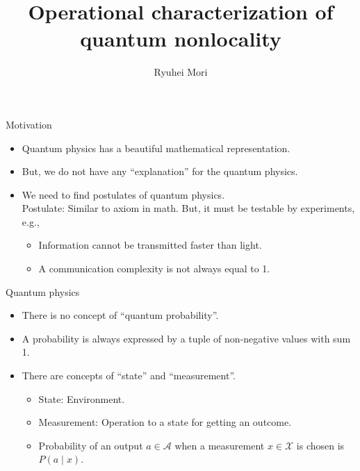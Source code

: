 \documentclass{beamer}
\title{Operational characterization of quantum nonlocality}
\author{Ryuhei Mori}
\institute{Tokyo Institute of Technology}
\date{}
\newcommand\emm[1]{\textcolor{redorange}{{#1}}}
\begin{document}
\begin{frame}[plain]
\maketitle
\end{frame}

\begin{frame}{Motivation}
\begin{itemize}
\setlength{\itemsep}{3.0em}
\item Quantum physics has a beautiful mathematical representation.
\item But, we do not have any ``explanation'' for the quantum physics.
\item We need to find \emm{postulates} of quantum physics.\\
\vspace{1em}
Postulate: Similar to axiom in math. But, it must be testable by experiments, e.g.,
\begin{itemize}
\item Information cannot be transmitted faster than light.
\item A communication complexity is not always equal to 1.
\end{itemize}
\end{itemize}
\end{frame}

\begin{frame}{Quantum physics}
\begin{itemize}
\setlength{\itemsep}{3.5em}
\item There is no concept of ``quantum probability''.
\item A probability is always expressed by a tuple of non-negative values with sum 1.
\item There are concepts of ``\emm{state}'' and ``\emm{measurement}''.
\begin{itemize}
\item State: Environment.
\item Measurement: Operation to a state for getting an outcome.
\item Probability of an output $a\in\mathcal{A}$ when a measurement $x\in\mathcal{X}$ is chosen is $P(a\mid x)$.
\end{itemize}
\end{itemize}
\end{frame}
\fi
\end{document}
